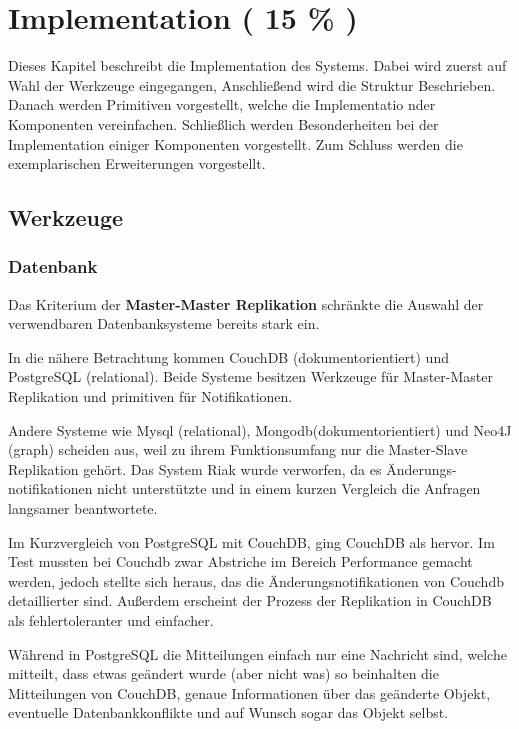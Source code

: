 \chapter{Implementation ( 15 \% ) }

Dieses Kapitel beschreibt die Implementation des Systems.
Dabei wird zuerst auf Wahl der Werkzeuge eingegangen,
Anschließend wird die Struktur Beschrieben.
Danach werden Primitiven vorgestellt, welche die Implementatio nder Komponenten vereinfachen.
Schließlich werden Besonderheiten bei der Implementation einiger Komponenten vorgestellt.
Zum Schluss werden die exemplarischen Erweiterungen vorgestellt.

\section{Werkzeuge}
\subsection{Datenbank}

Das Kriterium der \textbf{Master-Master Replikation}
schränkte die Auswahl der verwendbaren Datenbanksysteme bereits stark ein.

In die nähere Betrachtung kommen CouchDB (dokumentorientiert)
und PostgreSQL (relational).
Beide Systeme besitzen Werkzeuge f\"ur Master-Master Replikation
und primitiven für Notifikationen.

Andere Systeme wie Mysql (relational), Mongodb(dokumentorientiert)
und  Neo4J (graph) scheiden aus, weil zu ihrem Funktionsumfang
nur die Master-Slave Replikation geh\"ort.
Das System Riak wurde verworfen, da es \"Anderungs-notifikationen
nicht unterstützte und in einem kurzen Vergleich
die Anfragen langsamer beantwortete.

Im Kurzvergleich von PostgreSQL mit CouchDB,
ging CouchDB als  hervor.
Im Test mussten bei Couchdb zwar Abstriche im Bereich Performance gemacht werden,
jedoch stellte sich heraus, das die \"Anderungsnotifikationen von Couchdb detaillierter sind.
Außerdem erscheint der Prozess der Replikation in CouchDB
als fehlertoleranter und einfacher.

W\"ahrend in PostgreSQL die Mitteilungen einfach nur eine Nachricht sind,
welche mitteilt, dass etwas geändert wurde (aber nicht was)
so beinhalten die Mitteilungen von CouchDB, genaue Informationen
\"uber das ge\"anderte Objekt, eventuelle Datenbankkonflikte
und auf Wunsch sogar das Objekt selbst.

